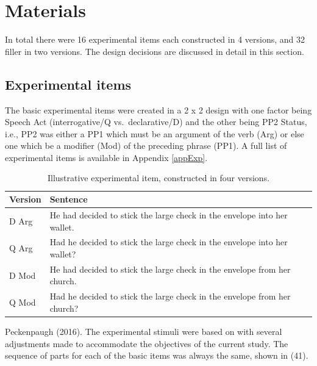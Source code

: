 \documentclass[12pt,oneside]{book}
\begin{document}
\hypertarget{mat}{%
\section{Materials}\label{mat}}

In total there were 16 experimental items each constructed in 4 versions, and 32 filler in two versions. The design decisions are discussed in detail in this section.

\hypertarget{experimental-items}{%
\subsection{Experimental items}\label{experimental-items}}

The basic experimental items were created in a 2 x 2 design with one factor being Speech Act (interrogative/Q vs.~declarative/D) and the other being PP2 Status, i.e., PP2 was either a PP1 which must be an argument of the verb (Arg) or else one which  be a modifier (Mod) of the preceding phrase (PP1). A full list of experimental items is available in Appendix \ref{appExp}.

\begin{table}[H]

\caption{\label{tab:sentences}Illustrative experimental item, constructed in four versions.}
\centering
\begin{tabular}{ll}
\toprule
Version & Sentence\\
\midrule
D Arg & He had decided to stick the large check in the envelope into her wallet.\\
Q Arg & Had he decided to stick the large check in the envelope into her wallet?\\
D Mod & He had decided to stick the large check in the envelope from her church.\\
Q Mod & Had he decided to stick the large check in the envelope from her church?\\
\bottomrule
\end{tabular}
\end{table}

 Peckenpaugh (2016). The experimental stimuli  were based on  with several adjustments made to accommodate the objectives of the current study. The sequence of parts for each of the basic items was always the same, shown in (41).
\end{document}
